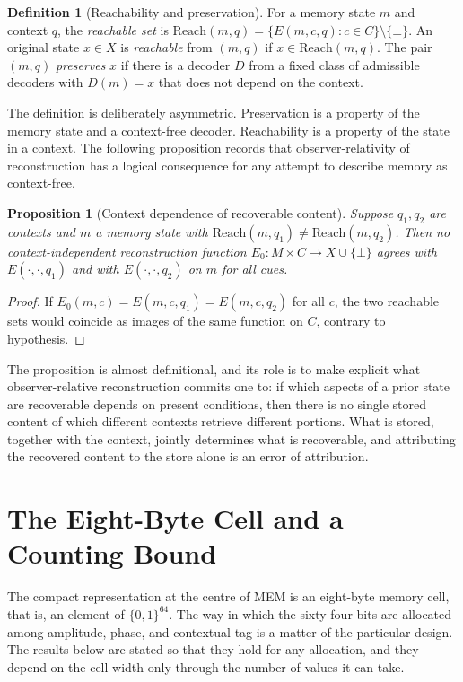 \documentclass[11pt,twoside,openright]{book}
\theoremstyle{plain}
\newtheorem{proposition}[theorem]{Proposition}
\theoremstyle{definition}
\newtheorem{definition}[theorem]{Definition}
\theoremstyle{remark}
\newcommand{\memeight}{\mbox{MEM\textbar 8}}
\begin{document}
\begin{definition}[Reachability and preservation]\label{def:reach}
For a memory state $m$ and context $q$, the \emph{reachable set} is $\mathrm{Reach}(m,q)=\{E(m,c,q):c\in C\}\setminus\{\bot\}$. An original state $x\in X$ is \emph{reachable} from $(m,q)$ if $x\in\mathrm{Reach}(m,q)$. The pair $(m,q)$ \emph{preserves} $x$ if there is a decoder $D$ from a fixed class of admissible decoders with $D(m)=x$ that does not depend on the context.
\end{definition}

The definition is deliberately asymmetric. Preservation is a property of the memory state and a context-free decoder. Reachability is a property of the state in a context. The following proposition records that observer-relativity of reconstruction has a logical consequence for any attempt to describe memory as context-free.

\begin{proposition}[Context dependence of recoverable content]\label{prop:ctx}
Suppose $q_1,q_2$ are contexts and $m$ a memory state with $\mathrm{Reach}(m,q_1)\neq\mathrm{Reach}(m,q_2)$. Then no context-independent reconstruction function $E_0:M\times C\to X\cup\{\bot\}$ agrees with $E(\cdot,\cdot,q_1)$ and with $E(\cdot,\cdot,q_2)$ on $m$ for all cues.
\end{proposition}

\begin{proof}
If $E_0(m,c)=E(m,c,q_1)=E(m,c,q_2)$ for all $c$, the two reachable sets would coincide as images of the same function on $C$, contrary to hypothesis.
\end{proof}

The proposition is almost definitional, and its role is to make explicit what observer-relative reconstruction commits one to: if which aspects of a prior state are recoverable depends on present conditions, then there is no single stored content of which different contexts retrieve different portions. What is stored, together with the context, jointly determines what is recoverable, and attributing the recovered content to the store alone is an error of attribution.

\section{The Eight-Byte Cell and a Counting Bound}

The compact representation at the centre of \memeight{} is an eight-byte memory cell, that is, an element of $\{0,1\}^{64}$. The way in which the sixty-four bits are allocated among amplitude, phase, and contextual tag is a matter of the particular design. The results below are stated so that they hold for any allocation, and they depend on the cell width only through the number of values it can take.
\end{document}
